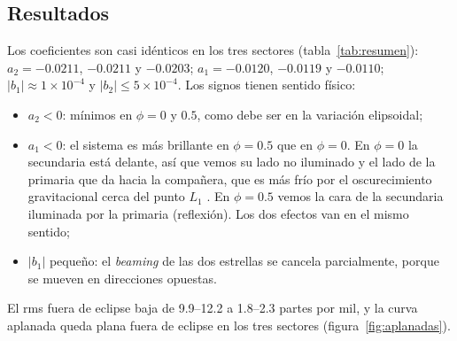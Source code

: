 \documentclass[11pt,a4paper]{article}
\begin{document}
\subsection{Resultados}
Los coeficientes son casi idénticos en los tres sectores (tabla~\ref{tab:resumen}):
$a_2=-0.0211$, $-0.0211$ y $-0.0203$; $a_1=-0.0120$, $-0.0119$ y $-0.0110$;
$|b_1|\approx1\times10^{-4}$ y $|b_2|\le5\times10^{-4}$. Los signos tienen sentido físico:
\begin{itemize}
\item $a_2<0$: mínimos en $\phi=0$ y $0.5$, como debe ser en la variación elipsoidal;
\item $a_1<0$: el sistema es más brillante en $\phi=0.5$ que en $\phi=0$. En $\phi=0$ la secundaria está
  delante, así que vemos su lado no iluminado y el lado de la primaria que da hacia la compañera, que
  es más frío por el oscurecimiento gravitacional cerca del punto $L_1$ \citep{vonZeipel1924}. En
  $\phi=0.5$ vemos la cara de la secundaria iluminada por la primaria (reflexión). Los dos efectos van
  en el mismo sentido;
\item $|b_1|$ pequeño: el \emph{beaming} de las dos estrellas se cancela parcialmente, porque se mueven en
  direcciones opuestas.
\end{itemize}
El rms fuera de eclipse baja de 9.9--12.2 a 1.8--2.3 partes por mil, y la curva aplanada queda plana
fuera de eclipse en los tres sectores (figura~\ref{fig:aplanadas}).
\end{document}
